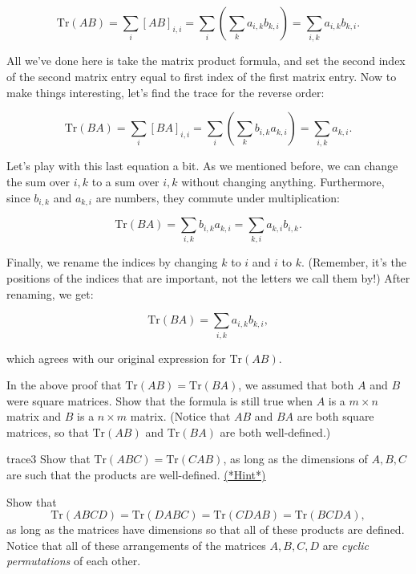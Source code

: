\[ \text{Tr} \left({A} {B}\right) = \sum_{i} [AB]_{i,i} = \sum_{i}\left( \sum_k a_{i,k}b_{k,i}\right) = \sum_{i,k}a_{i,k}b_{k,i}. \]

All we've done here is take the matrix product formula, and set the second index of the second  matrix entry equal to first index of the first matrix entry.  Now to make things interesting, let's find the trace for the reverse order:

\[ \text{Tr} \left({B} {A}\right) = \sum_{i} [BA]_{i,i} = \sum_{i} \left( \sum_{k} b_{i,k}a_{k,i} \right) = \sum_{i,k}a_{k,i}. \]

Let's play with this last equation a bit. As we mentioned before, we can change the sum over $i,k$ to a sum over $i,k$ without changing anything. Furthermore, since $b_{i,k}$ and $a_{k,i}$ are numbers, they commute under multiplication:

\[ \text{Tr} \left({B} {A}\right) =\sum_{i,k} b_{i,k}a_{k,i} =  \sum_{k,i} a_{k,i}b_{i,k}. \]

Finally, we rename the indices by changing $k$ to $i$ and $i$ to $k$.  (Remember, it's the positions of the indices that are important, not the letters we call them by!)  After renaming, we get:

\[ \text{Tr} \left({B} {A}\right) =\sum_{i,k} a_{i,k}b_{k,i}, \]

which agrees with our original expression for  $\text{Tr} ({A}{B})$.

\begin{exercise}{}
In the above proof that $\text{Tr} ({AB}) = \text{Tr}({BA})$, we assumed that both $A$ and $B$ were square matrices. Show that the formula is still true when $A$ is a $m \times n$ matrix and $B$ is a $n \times m$ matrix.  (Notice that $AB$ and $BA$ are both square matrices, so that $\text{Tr} \left({A} {B}\right)$ and $\text{Tr} \left({B} {A}\right)$ are both well-defined.)
\end{exercise}

\begin{exercise}{trace3}
Show that $\text{Tr} ({ABC}) = \text{Tr}({CAB})$, as long as the dimensions of $A, B, C$ are such that the products are well-defined.
\hyperref[sec:sigma:hints]{(*Hint*)} 
\end{exercise}


\begin{exercise}{}
Show that 
\[ \text{Tr} ({ABCD}) = \text{Tr}({DABC})= \text{Tr}({CDAB}) = \text{Tr}({BCDA}),\] 
as long as the matrices have dimensions so that all of these products are defined.  Notice that all of these arrangements of the matrices $A, B, C, D$ are \emph{cyclic permutations} of each other.
\end{exercise}

